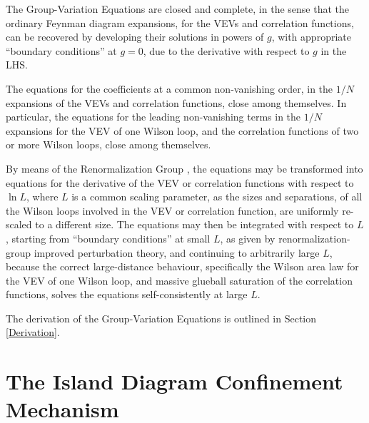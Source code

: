 \documentclass[a4paper,12pt,oneside]{article}
\begin{document}
The Group-Variation Equations are closed and complete, in the sense that the
ordinary Feynman diagram expansions, for the VEVs and correlation functions,
can be recovered by developing their solutions in powers of $g$, with
appropriate ``boundary conditions'' at $g=0$, due to the derivative with
respect to $g$ in the LHS.

The equations for the coefficients at a common
non-vanishing order, in the $1/N$ expansions of the VEVs and correlation
functions, close among themselves.  In particular, the equations for the
leading non-vanishing terms in the $1/N$ expansions for the VEV of one
Wilson loop, and the correlation functions of two or more Wilson loops,
close among themselves.

By means of the Renormalization Group \cite{RGE}, the equations may be transformed into
equations for the derivative of the VEV or correlation functions with
respect to $\ln L$, where $L$ is a common scaling parameter, as the sizes
and separations, of all the Wilson loops involved in the VEV or correlation
function, are uniformly re-scaled to a different size.  The equations may
then be integrated with respect to $L$, starting from ``boundary conditions''
at small $L$, as given by renormalization-group improved perturbation
theory, and continuing to arbitrarily large $L$, because the correct
large-distance behaviour, specifically the Wilson area law \cite{Wilson} for the VEV of
one Wilson loop, and massive glueball saturation of the correlation
functions, solves the equations self-consistently at large $L$.

The derivation of the Group-Variation Equations is outlined in Section 
\ref{Derivation}.

\section{The Island Diagram Confinement Mechanism}
\end{document}
